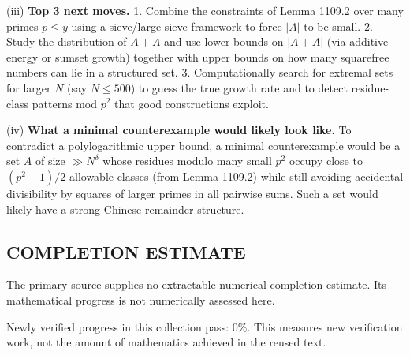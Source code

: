 (iii) \textbf{Top 3 next moves.}
1. Combine the constraints of Lemma 1109.2 over many primes $p\le y$ using a sieve/large-sieve framework to force $|A|$ to be small.
2. Study the distribution of $A+A$ and use lower bounds on $|A+A|$ (via additive energy or sumset growth) together with upper bounds on how many squarefree numbers can lie in a structured set.
3. Computationally search for extremal sets for larger $N$ (say $N\le 500$) to guess the true growth rate and to detect residue-class patterns mod $p^2$ that good constructions exploit.

(iv) \textbf{What a minimal counterexample would likely look like.}
To contradict a polylogarithmic upper bound, a minimal counterexample would be a set $A$ of size $\gg N^{\delta}$ whose residues modulo many small $p^2$ occupy close to $(p^2-1)/2$ allowable classes (from Lemma 1109.2) while still avoiding accidental divisibility by squares of larger primes in all pairwise sums. Such a set would likely have a strong Chinese-remainder structure.




\subsection*{COMPLETION ESTIMATE}
The primary source supplies no extractable numerical completion estimate. Its mathematical progress is not numerically assessed here.

Newly verified progress in this collection pass: $0\%$. This measures new verification work, not the amount of mathematics achieved in the reused text.
